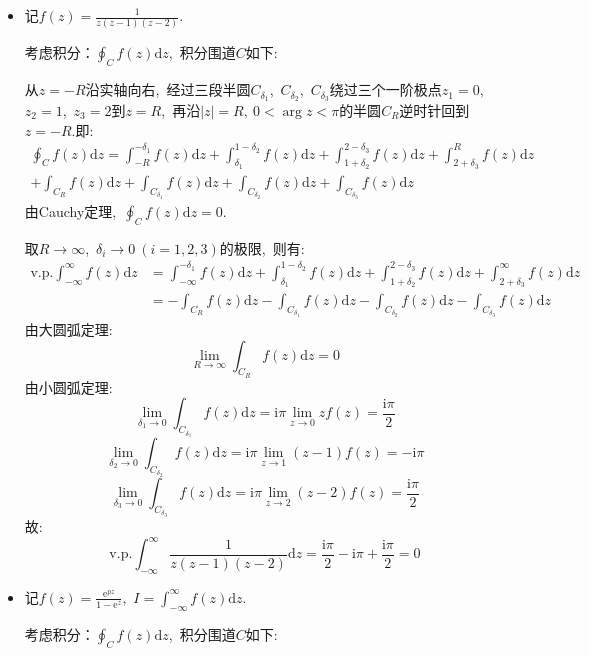 \documentclass[a4paper,fontset=windows]{ctexart}
\begin{document}
\begin{itemize}
\bigskip
\item[8.(1)]
记$f(z)=\frac{1}{z(z-1)(z-2)}$.

考虑积分：$\oint_{C}f(z)\mathrm{d}z$,\ 积分围道$C$如下:

从$z=-R$沿实轴向右,\ 经过三段半圆$C_{\delta_1}$,\ $C_{\delta_2}$,\ $C_{\delta_3}$绕过三个一阶极点$z_1=0$,\ $z_2=1$,\ $z_3=2$到$z=R$,\ 再沿$|z|=R,\ 0<\arg z<\pi$的半圆$C_R$逆时针回到$z=-R$.即:
\begin{align*}
\oint_{C}f(z)\mathrm{d}z
=\int_{-R}^{-\delta_1}f(z)\mathrm{d}z+
\int_{\delta_1}^{1-\delta_2}f(z)\mathrm{d}z+
\int_{1+\delta_2}^{2-\delta_3}f(z)\mathrm{d}z+
\int_{2+\delta_3}^{R}f(z)\mathrm{d}z \\
+\int_{C_R}f(z)\mathrm{d}z+
\int_{C_{\delta_1}}f(z)\mathrm{d}z+
\int_{C_{\delta_2}}f(z)\mathrm{d}z+
\int_{C_{\delta_3}}f(z)\mathrm{d}z
\end{align*}
由Cauchy定理,\ $\oint_{C}f(z)\mathrm{d}z=0$.

取$R\rightarrow\infty$,\ $\delta_i\rightarrow0\ (i=1,2,3)$的极限,\ 则有:
\begin{align*}
\mathrm{v.p.}\int_{-\infty}^{\infty}f(z)\mathrm{d}z
&=\int_{-\infty}^{-\delta_1}f(z)\mathrm{d}z+
\int_{\delta_1}^{1-\delta_2}f(z)\mathrm{d}z+
\int_{1+\delta_2}^{2-\delta_3}f(z)\mathrm{d}z+
\int_{2+\delta_3}^{\infty}f(z)\mathrm{d}z \\
&=-\int_{C_R}f(z)\mathrm{d}z-
\int_{C_{\delta_1}}f(z)\mathrm{d}z-
\int_{C_{\delta_2}}f(z)\mathrm{d}z-\int_{C_{\delta_3}}f(z)\mathrm{d}z
\end{align*}
由大圆弧定理:
\[
\lim_{R \to \infty}\int_{C_R}f(z)\mathrm{d}z=0
\]
由小圆弧定理:
\[
\lim_{\delta_1 \to 0}\int_{C_{\delta_1}}f(z)\mathrm{d}z
=\mathrm{i}\pi\lim_{z \to 0}zf(z)
=\frac{\mathrm{i}\pi}{2}
\]
\[
\lim_{\delta_2 \to 0}\int_{C_{\delta_2}}f(z)\mathrm{d}z
=\mathrm{i}\pi\lim_{z \to 1}(z-1)f(z)
=-\mathrm{i}\pi
\]
\[
\lim_{\delta_3 \to 0}\int_{C_{\delta_3}}f(z)\mathrm{d}z
=\mathrm{i}\pi\lim_{z \to 2}(z-2)f(z)
=\frac{\mathrm{i}\pi}{2}
\]
故:
\[
\mathrm{v.p.}\int_{-\infty}^{\infty}\frac{1}{z(z-1)(z-2)}\mathrm{d}z
=\frac{\mathrm{i}\pi}{2}-\mathrm{i}\pi+\frac{\mathrm{i}\pi}{2}
=0
\]

\smallskip
\item[8.(4)]
记$f(z)=\frac{\mathrm{e}^{pz}}{1-\mathrm{e}^z}$,\ $I=\int_{-\infty}^{\infty}f(z)\mathrm{d}z$.

考虑积分：$\oint_{C}f(z)\mathrm{d}z$,\ 积分围道$C$如下:


\end{itemize}
\end{document}
